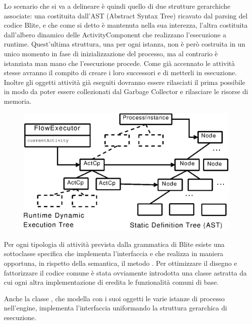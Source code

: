 Lo scenario che si va a delineare \`e quindi quello di due strutture gerarchiche
associate: una costituita dall'AST (Abstract Syntax Tree) ricavato dal
parsing del codice Blite, e che come si detto \`e mantenuta nella sua interezza,
l'altra costituita dall'albero dinamico delle ActivityComponent che
realizzano l'esecuzione a runtime. Quest'ultima struttura, una per ogni
istanza, non \`e però costruita in un unico momento in fase di inizializzazione
del  processo, ma al contrario \`e istanziata man mano che l'esecuzione
procede.  Come già accennato le attività stesse avranno il compito di creare
i loro successori e di metterli in esecuzione. Inoltre gli oggetti attività
già eseguiti dovranno essere rilasciati il prima possibile in modo da poter 
essere collezionati dal Garbage Collector e rilasciare le risorse di memoria.

\begin{figure}[!htp]
\begin{center}
  \includegraphics{architettura_interna/dia/tries}
  \label{fig:1}
\end{center}
\end{figure}

Per ogni tipologia di attività prevista dalla grammatica di Blite esiste
una sottoclasse specifica che implementa l'interfaccia
 e che realizza in maniera opportuna, in rispetto
della semantica, il metodo . 
Per ottimizzare il disegno e fattorizzare
il codice comune \`e stata ovviamente introdotta una classe astratta
 da cui ogni altra implementazione di
 eredita le funzionalità comuni di base.

Anche la classe , che modella con i suoi oggetti le
varie istanze di processo nell'engine, implementa l'interfaccia
 uniformando la struttura gerarchica di esecuzione.

